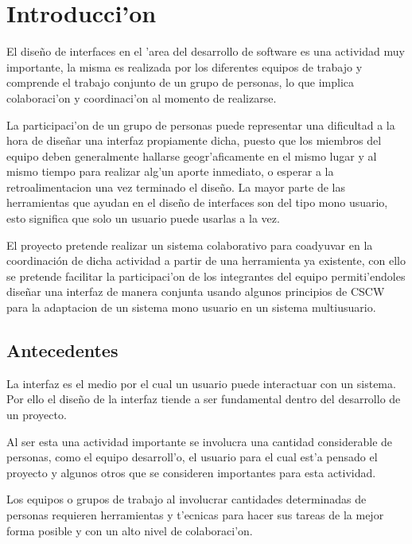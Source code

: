 \chapter{Introducci'on}
\label{capitulouno}

El dise\~no de interfaces en el 'area del desarrollo de software es una actividad muy importante, la misma es realizada por los diferentes equipos de trabajo y comprende el trabajo conjunto de un grupo de personas, lo que implica colaboraci'on y coordinaci'on al momento de realizarse.

\medskip

La participaci'on de un grupo de personas puede representar una dificultad a la hora de dise\~nar una interfaz propiamente dicha, puesto que los miembros del equipo deben generalmente hallarse geogr'aficamente en el mismo lugar y al mismo tiempo para realizar alg'un aporte inmediato, o esperar a la retroalimentacion una vez terminado el dise\~no. La mayor parte de las herramientas que ayudan en el dise\~no de interfaces son del tipo mono usuario, esto significa que solo un usuario puede usarlas a la vez.

\medskip

El proyecto pretende realizar un sistema colaborativo para coadyuvar en la coordinación de dicha actividad a partir de una herramienta ya existente, con ello se pretende facilitar la participaci'on de los integrantes del equipo permiti'endoles dise\~nar una interfaz de manera conjunta usando algunos principios de CSCW para la adaptacion de un sistema mono usuario en un sistema multiusuario.


\section{Antecedentes}

La interfaz es el medio por el cual un usuario puede interactuar con un sistema. Por ello el dise\~no de la interfaz tiende a ser fundamental dentro del desarrollo de un proyecto.

\medskip
 
Al ser esta una actividad importante se involucra una cantidad considerable de personas, como el equipo desarroll'o, el usuario para el cual est'a pensado el proyecto y algunos otros que se consideren importantes para esta actividad.

Los equipos o grupos de trabajo al involucrar cantidades determinadas de personas requieren herramientas y t'ecnicas para hacer sus tareas de la mejor forma posible y con un alto nivel de colaboraci'on.

